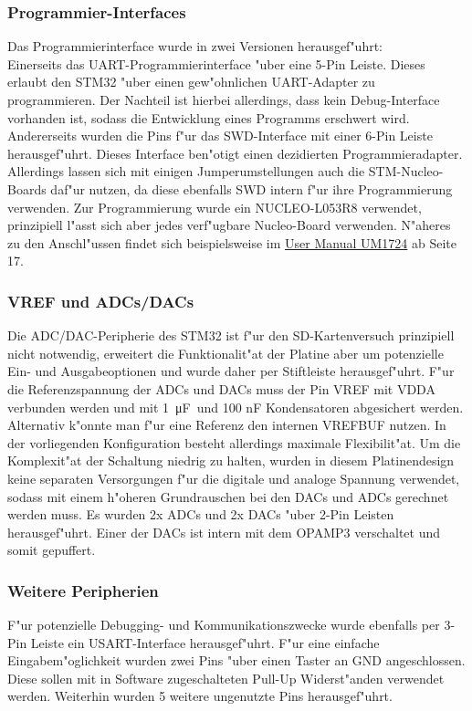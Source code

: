 \documentclass[11pt]{article}
\newcommand*{\uF}{\ \si{\micro\farad}}
\begin{document}
\subsubsection{Programmier-Interfaces}
Das Programmierinterface wurde in zwei Versionen herausgef"uhrt:\\
Einerseits das UART-Programmierinterface "uber eine 5-Pin Leiste.
Dieses erlaubt den STM32 "uber einen gew"ohnlichen UART-Adapter zu programmieren.
Der Nachteil ist hierbei allerdings, dass kein Debug-Interface vorhanden ist,
sodass die Entwicklung eines Programms erschwert wird. \\
Andererseits wurden die Pins f"ur das SWD-Interface mit einer 6-Pin Leiste herausgef"uhrt.
Dieses Interface ben"otigt einen dezidierten Programmieradapter. Allerdings lassen sich
mit einigen Jumperumstellungen auch die STM-Nucleo-Boards daf"ur nutzen,
da diese ebenfalls SWD intern f"ur ihre Programmierung verwenden. 
Zur Programmierung wurde ein NUCLEO-L053R8 verwendet, prinzipiell l"asst sich aber
jedes verf"ugbare Nucleo-Board verwenden.
N"aheres zu den Anschl"ussen findet sich beispielsweise im \href{https://www.st.com/resource/en/user_manual/um1724-stm32-nucleo64-boards-mb1136-stmicroelectronics.pdf}{User Manual UM1724} \cite{st4} ab Seite
17.


\subsubsection{VREF und ADCs/DACs}
Die ADC/DAC-Peripherie des STM32 ist f"ur den SD-Kartenversuch prinzipiell nicht notwendig,
erweitert die Funktionalit"at der Platine aber um potenzielle Ein- und Ausgabeoptionen und wurde
daher per Stiftleiste herausgef"uhrt.
F"ur die Referenzspannung der ADCs und DACs muss der Pin VREF mit VDDA verbunden werden und mit 
1\uF\ und 100 nF Kondensatoren abgesichert werden. Alternativ k"onnte man f"ur
eine Referenz den internen VREFBUF nutzen. In der vorliegenden Konfiguration besteht allerdings
maximale Flexibilit"at. Um die Komplexit"at der Schaltung niedrig zu halten, 
wurden in diesem Platinendesign keine separaten Versorgungen f"ur die digitale und analoge Spannung
verwendet, sodass mit einem h"oheren Grundrauschen bei den DACs und ADCs gerechnet werden muss. 
Es wurden 2x ADCs und 2x DACs "uber 2-Pin Leisten herausgef"uhrt. Einer der DACs ist intern
mit dem OPAMP3 verschaltet und somit gepuffert. 

\subsubsection{Weitere Peripherien}
F"ur potenzielle Debugging- und Kommunikationszwecke wurde ebenfalls per 3-Pin Leiste ein
USART-Interface herausgef"uhrt. F"ur eine einfache Eingabem"oglichkeit wurden zwei Pins
"uber einen Taster an GND angeschlossen. Diese sollen mit in Software zugeschalteten Pull-Up Widerst"anden
verwendet werden. Weiterhin wurden 5 weitere ungenutzte Pins herausgef"uhrt.
\end{document}
